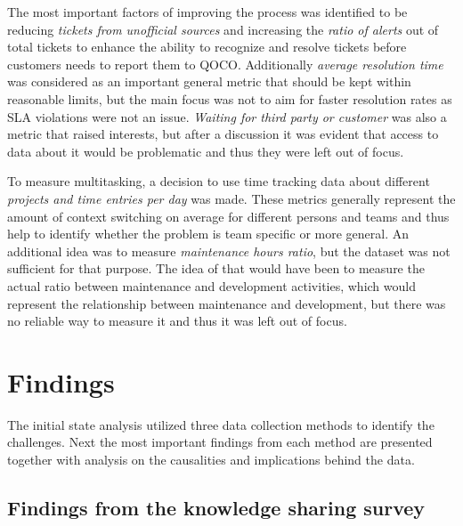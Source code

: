 The most important factors of improving the process was identified to be reducing \emph{tickets from unofficial sources} and increasing the \emph{ratio of alerts} out of total tickets to
enhance the ability to recognize and resolve tickets before customers needs to report them to QOCO. Additionally \emph{average resolution time} was considered as an important general metric
that should be kept within reasonable limits, but the main focus was not to aim for faster resolution rates as SLA violations were not an issue. \emph{Waiting for third party or customer}
was also a metric that raised interests, but after a discussion it was evident that access to data about it would be problematic and thus they were left out of focus.

To measure multitasking, a decision to use time tracking data about different \emph{projects and time entries per day} was made. These metrics generally represent the amount of context switching
on average for different persons and teams and thus help to identify whether the problem is team specific or more general. An additional idea was to measure \emph{maintenance hours ratio}, but the
dataset was not sufficient for that purpose. The idea of that would have been to measure the actual ratio between maintenance and development activities, which would represent the
relationship between maintenance and development, but there was no reliable way to measure it and thus it was left out of focus.

\section{Findings}
\label{section:findings-before}

The initial state analysis utilized three data collection methods to identify the challenges. Next the most important findings from each method are presented together
with analysis on the causalities and implications behind the data.

\subsection{Findings from the knowledge sharing survey}
\label{section:survey-results-before}

